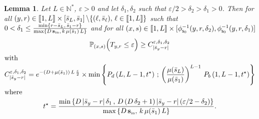 \documentclass[10pt]{amsart}
\newtheorem{lemm}[theo]{Lemma}\newtheorem{prop}[theo]{Proposition}\newtheorem{coro}[theo]{Corollary}\newtheorem{conj}[theo]{Conjecture}
\theoremstyle{definition}\newtheorem{defi}[theo]{Definition}\newtheorem{rema}[theo]{Remark}\newtheorem{exam}[theo]{Example}\newtheorem{exem}[theo]{Example}\newtheorem{nota}[theo]{Notation}
\newcommand{\llbracket}{\mathopen{[\mkern -2.7mu[}}
\newcommand{\rrbracket}{\mathclose{]\mkern -2.7mu]}}
\newcommand{\PP}{\mathbb{P}}
\newcommand{\NN}{\mathbb{N}}
\newcommand{\Sin}{{\mathbf s}_{\textrm{\tiny\rm in}}}
\newcommand{\barmu}{\mu(\bar s_1)}
\newcommand{\ens}[2]{\left[#1,#2\right]}
\newcommand{\phis}{\phi_{\textsf{s}_0}^{-1}}
\newcommand{\setunL}{\llbracket 1, L\rrbracket}
\newcommand{\1}{\mathbf{1}}
\begin{document}
\begin{lemm}\label{reach.y_s_general}
Let $L\in \NN^*$, $\varepsilon>0$ and let $\delta_1, \delta_2$ such that $\varepsilon/2>\delta_2>\delta_1>0$. Then for all $(y,r)\in \setunL \times \ens{\bar s_L}{\bar s_1} \backslash \{(\ell,\bar s_\ell),\, \ell\in \setunL\}$ such that $0<\delta_1\leq \frac{\min\{r-\bar s_{L},\, \bar s_1-r\}}{\max\{D\,\Sin,\, k\,\barmu\,L\}}$ and for all $(x,s) \in \setunL \times [\phis(y,r,\delta_2), \phis(y,r,\delta_1)]$
\begin{gather*}
\PP_{(x,s)}
\Big(T_{y,r} \leq \varepsilon \Big)\geq C^{\varepsilon, \delta_1, \delta_2}_{\left|\bar s_y -r\right|}
\\
\intertext{with}
C^{\varepsilon, \delta_1, \delta_2}_{\left|\bar s_y -r\right|} = e^{-(D+\barmu)\,L\,\frac{\varepsilon}{2}}
\times
\min\left\{P_d\left(L,L-1, t^\star\right) \, ; \,
\left(\frac{\mu(\bar s_L)}{\barmu}\right)^{L-1}\,P_b\left(1,L-1, t^\star\right)\right\}
\\
\intertext{where}
t^\star =
\frac{\min \left\{D\,|\bar s_y-r|\,\delta_1 \,, \, D\,(D\,\delta_2+1)\,|\bar s_y-r|\,(\varepsilon/2-\delta_2)\right\}} {\max\left\{D\,\Sin,\,k\,\barmu\,L\right\}}.
\end{gather*}
\end{lemm}
\end{document}
